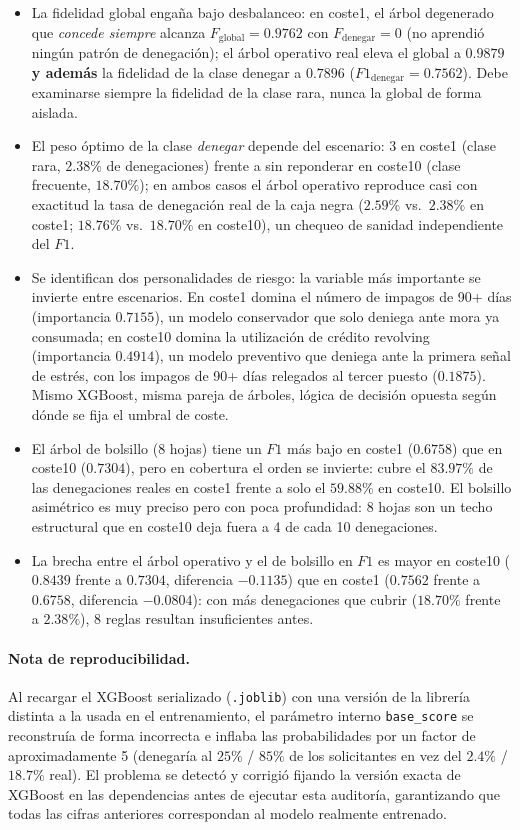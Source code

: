 \documentclass[11pt,a4paper]{article}
\begin{document}
\begin{itemize}
\item La fidelidad global engaña bajo desbalanceo: en coste1, el árbol degenerado que \emph{concede siempre} alcanza $F_{\text{global}}=0.9762$ con $F_{\text{denegar}}=0$ (no aprendió ningún patrón de denegación); el árbol operativo real eleva el global a $0.9879$ \textbf{y además} la fidelidad de la clase denegar a $0.7896$ ($F1_{\text{denegar}}=0.7562$). Debe examinarse siempre la fidelidad de la clase rara, nunca la global de forma aislada.
\item El peso óptimo de la clase \emph{denegar} depende del escenario: 3 en coste1 (clase rara, $2.38\%$ de denegaciones) frente a sin reponderar en coste10 (clase frecuente, $18.70\%$); en ambos casos el árbol operativo reproduce casi con exactitud la tasa de denegación real de la caja negra ($2.59\%$ vs.\ $2.38\%$ en coste1; $18.76\%$ vs.\ $18.70\%$ en coste10), un chequeo de sanidad independiente del $F1$.
\item Se identifican dos personalidades de riesgo: la variable más importante se invierte entre escenarios. En coste1 domina el número de impagos de 90+ días (importancia $0.7155$), un modelo conservador que solo deniega ante mora ya consumada; en coste10 domina la utilización de crédito revolving (importancia $0.4914$), un modelo preventivo que deniega ante la primera señal de estrés, con los impagos de 90+ días relegados al tercer puesto ($0.1875$). Mismo XGBoost, misma pareja de árboles, lógica de decisión opuesta según dónde se fija el umbral de coste.
\item El árbol de bolsillo (8 hojas) tiene un $F1$ más bajo en coste1 ($0.6758$) que en coste10 ($0.7304$), pero en cobertura el orden se invierte: cubre el $83.97\%$ de las denegaciones reales en coste1 frente a solo el $59.88\%$ en coste10. El bolsillo asimétrico es muy preciso pero con poca profundidad: 8 hojas son un techo estructural que en coste10 deja fuera a 4 de cada 10 denegaciones.
\item La brecha entre el árbol operativo y el de bolsillo en $F1$ es mayor en coste10 ($0.8439$ frente a $0.7304$, diferencia $-0.1135$) que en coste1 ($0.7562$ frente a $0.6758$, diferencia $-0.0804$): con más denegaciones que cubrir ($18.70\%$ frente a $2.38\%$), 8 reglas resultan insuficientes antes.
\end{itemize}

\paragraph{Nota de reproducibilidad.} Al recargar el XGBoost serializado (\texttt{.joblib}) con una versión de la librería distinta a la usada en el entrenamiento, el parámetro interno \texttt{base\_score} se reconstruía de forma incorrecta e inflaba las probabilidades por un factor de aproximadamente 5 (denegaría al $25\%$ / $85\%$ de los solicitantes en vez del $2.4\%$ / $18.7\%$ real). El problema se detectó y corrigió fijando la versión exacta de XGBoost en las dependencias antes de ejecutar esta auditoría, garantizando que todas las cifras anteriores correspondan al modelo realmente entrenado.
\end{document}
